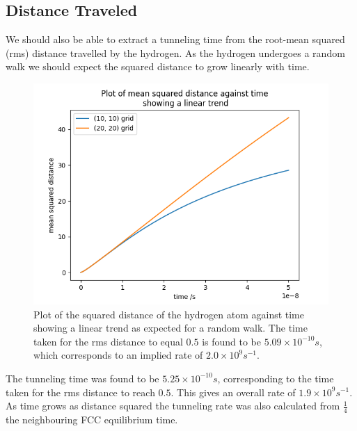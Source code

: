 \subsection{Distance Traveled}
We should also be able to
extract a tunneling time from
the root-mean squared (rms)
distance travelled by the
hydrogen. As the hydrogen
undergoes a random walk we should
expect the squared distance to
grow linearly with time.
\begin{figure}
    \centering
    \includegraphics[width=0.5\linewidth]{Figures/Redfield/Plot of lindblad solution squared distance.png}
    \caption{Plot of the squared distance
    of the hydrogen atom against time
    showing a linear trend as expected
    for a random walk. The time taken
    for the rms distance to equal \(0.5\)
    is found to be
    \(5.09\times{}10^{-10}s\),
    which corresponds to an implied rate
    of \(2.0 \times 10^{9}s^{-1}\).
    }
\end{figure}
The tunneling time was
found to be \(5.25\times{}10^{-10}s\),
corresponding to the time taken
for the rms distance to
reach \(0.5\). This gives
an overall rate of
\(1.9 \times 10^{9}s^{-1}\).
As time grows as distance squared
the tunneling rate was also
calculated from
\(\frac{1}{4}\) the
neighbouring FCC equilibrium
time.

